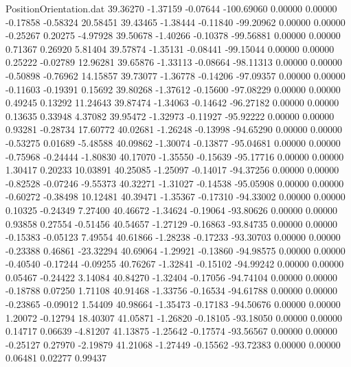 \begin{filecontents}{PositionOrientation.dat}
  39.36270   -1.37159   -0.07644  -100.69060    0.00000    0.00000   -0.17858   -0.58324   20.58451
  39.43465   -1.38444   -0.11840   -99.20962    0.00000    0.00000   -0.25267    0.20275   -4.97928
  39.50678   -1.40266   -0.10378   -99.56881    0.00000    0.00000    0.71367    0.26920    5.81404
  39.57874   -1.35131   -0.08441   -99.15044    0.00000    0.00000    0.25222   -0.02789   12.96281
  39.65876   -1.33113   -0.08664   -98.11313    0.00000    0.00000   -0.50898   -0.76962   14.15857
  39.73077   -1.36778   -0.14206   -97.09357    0.00000    0.00000   -0.11603   -0.19391    0.15692
  39.80268   -1.37612   -0.15600   -97.08229    0.00000    0.00000    0.49245    0.13292   11.24643
  39.87474   -1.34063   -0.14642   -96.27182    0.00000    0.00000    0.13635    0.33948    4.37082
  39.95472   -1.32973   -0.11927   -95.92222    0.00000    0.00000    0.93281   -0.28734   17.60772
  40.02681   -1.26248   -0.13998   -94.65290    0.00000    0.00000   -0.53275    0.01689   -5.48588
  40.09862   -1.30074   -0.13877   -95.04681    0.00000    0.00000   -0.75968   -0.24444   -1.80830
  40.17070   -1.35550   -0.15639   -95.17716    0.00000    0.00000    1.30417    0.20233   10.03891
  40.25085   -1.25097   -0.14017   -94.37256    0.00000    0.00000   -0.82528   -0.07246   -9.55373
  40.32271   -1.31027   -0.14538   -95.05908    0.00000    0.00000   -0.60272   -0.38498   10.12481
  40.39471   -1.35367   -0.17310   -94.33002    0.00000    0.00000    0.10325   -0.24349    7.27400
  40.46672   -1.34624   -0.19064   -93.80626    0.00000    0.00000    0.93858    0.27554   -0.51456
  40.54657   -1.27129   -0.16863   -93.84735    0.00000    0.00000   -0.15383   -0.05123    7.49554
  40.61866   -1.28238   -0.17233   -93.30703    0.00000    0.00000   -0.23388    0.46861  -23.32294
  40.69064   -1.29921   -0.13860   -94.98575    0.00000    0.00000   -0.40540   -0.17244   -0.09255
  40.76267   -1.32841   -0.15102   -94.99242    0.00000    0.00000    0.05467   -0.24422    3.14084
  40.84270   -1.32404   -0.17056   -94.74104    0.00000    0.00000   -0.18788    0.07250    1.71108
  40.91468   -1.33756   -0.16534   -94.61788    0.00000    0.00000   -0.23865   -0.09012    1.54409
  40.98664   -1.35473   -0.17183   -94.50676    0.00000    0.00000    1.20072   -0.12794   18.40307
  41.05871   -1.26820   -0.18105   -93.18050    0.00000    0.00000    0.14717    0.06639   -4.81207
  41.13875   -1.25642   -0.17574   -93.56567    0.00000    0.00000   -0.25127    0.27970   -2.19879
  41.21068   -1.27449   -0.15562   -93.72383    0.00000    0.00000    0.06481    0.02277    0.99437

\end{filecontents}
